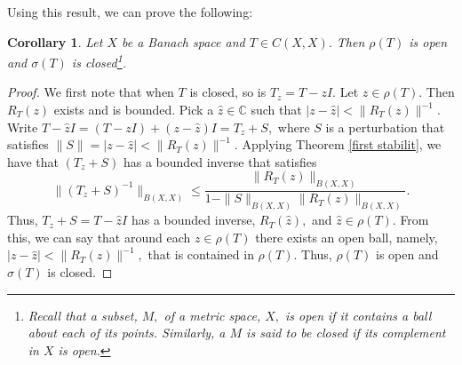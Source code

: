 \documentclass[12pt,a4paper]{article}
\theoremstyle{boldthm}
\newtheorem{corollary}[theorem]{Corollary}
\theoremstyle{bolddefn}
\begin{document}
Using this result, we can prove the following:
\begin{corollary} \label{C1}
    Let $X$ be a Banach space and $T \in C(X, X).$ Then $\rho(T)$ is open and $\sigma(T)$ is closed\footnote{Recall that a subset, $M,$ of a metric space, $X,$ is open if it contains a ball about each of its points. Similarly, a $M$ is said to be closed if its complement in $X$ is open.}.
\end{corollary}
\begin{proof}
    We first note that when $T$ is closed, so is $T_z = T-zI.$ Let $z \in \rho(T).$ Then $R_T(z)$ exists and is bounded.  Pick a $\hat z \in \mathbb{C}$ such that $| z - \hat z | < \| R_T(z) \|^{-1}.$ Write $T - \hat z I = (T-zI) + (z-\hat z)I = T_z + S,$ where $S$ is a perturbation that satisfies $\|S\| = |z- \hat z| < \|R_T(z)\|^{-1}.$ Applying Theorem \ref{first stabilit}, we have that $(T_z + S)$ has a bounded inverse that satisfies
    \begin{equation}
    \| (T_z + S)^{-1} \|_{B(X, X)} \le \frac{\|R_T(z)\|_{B(X, X)}} { 1 - \| S \|_{B(X, X)} \| R_T(z) \|_{B(X, X)}}.
    \end{equation}
    Thus, $T_z + S = T - \hat z I $ has a bounded inverse, $R_T(\hat z),$ and $\hat z \in \rho(T).$ From this, we can say that around each $z \in \rho(T)$ there exists an open ball, namely, $|z - \hat z| < \| R_T(z) \|^{-1},$ that is contained in $\rho(T).$ Thus, $\rho(T)$ is open and $\sigma(T)$ is closed.
\end{proof}
\end{document}
